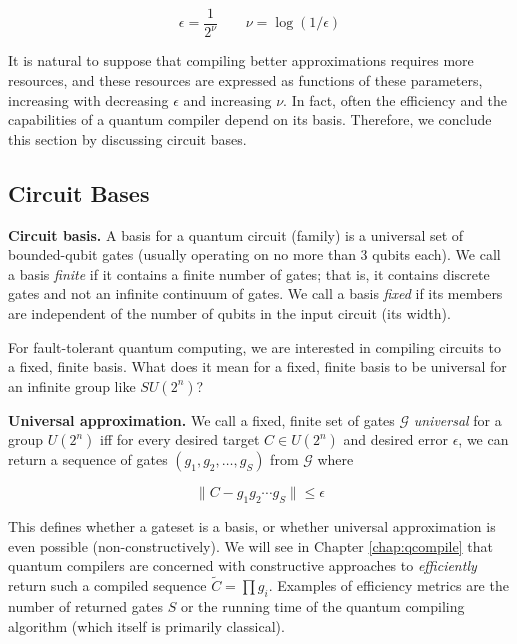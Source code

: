 \begin{equation}
\epsilon = \frac{1}{2^\nu} \qquad
\nu = \log(1/\epsilon)
\end{equation}

It is natural to suppose that compiling better approximations requires
more resources, and these resources are expressed as functions of
these
parameters, increasing with decreasing $\epsilon$ and increasing $\nu$.
In fact, often the efficiency and the
capabilities of a quantum
compiler depend on its basis. Therefore, we conclude this section by
discussing circuit bases.

\subsection{Circuit Bases}
\label{subsec:qcompile-bases}

\begin{definition}{\textbf{Circuit basis.}}
A basis for a quantum circuit (family) is a universal set of
bounded-qubit gates (usually operating on no more than 3 qubits each).
We call a basis \emph{finite} if it contains a finite
number of gates; that is, it contains discrete gates and not an infinite
continuum of gates. We call a basis \emph{fixed} if its members are independent
of the number of qubits in the input circuit (its width).
\end{definition}

For fault-tolerant quantum computing, we are interested in compiling
circuits to a fixed, finite basis. What does it mean for a fixed, finite
basis to be universal for an infinite group like $SU(2^n)$?

\begin{definition}{\textbf{Universal approximation.}}
We call a fixed, finite set of gates $\mathcal{G}$ \emph{universal} for
a group $U(2^n)$ iff for every desired target $C \in U(2^n)$ and
desired error $\epsilon$, we can return a
sequence of gates $(g_1,g_2,\ldots,g_S)$ from $\mathcal{G}$ where

\begin{equation}
\| C - g_1 g_2 \cdots g_S \| \le \epsilon
\end{equation}

\end{definition}

This defines whether a gateset is a basis, or whether universal approximation
is even possible (non-constructively). We will see in
Chapter \ref{chap:qcompile} that
quantum compilers are concerned with constructive approaches to
\emph{efficiently} return such a compiled sequence $\tilde{C} = \prod g_i$.
Examples of efficiency metrics are the number of returned gates $S$ or
the running time of the quantum compiling algorithm (which itself is
primarily classical).

